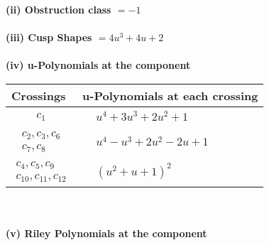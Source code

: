 \documentclass[1p]{elsarticle_modified}
\theoremstyle{definition}
\begin{document}
\flushleft \textbf{(ii) Obstruction class $= -1$}\\~\\
\flushleft \textbf{(iii) Cusp Shapes $= 4 u^3+4 u+2$}\\~\\
\newpage\renewcommand{\arraystretch}{1}
\flushleft \textbf{(iv) u-Polynomials at the component}\newline \\
\begin{tabular}{m{50pt}|m{274pt}}
Crossings & \hspace{64pt}u-Polynomials at each crossing \\
\hline $$\begin{aligned}c_{1}\end{aligned}$$&$\begin{aligned}
&u^4+3 u^3+2 u^2+1
\end{aligned}$\\
\hline $$\begin{aligned}c_{2},c_{3},c_{6}\\c_{7},c_{8}\end{aligned}$$&$\begin{aligned}
&u^4- u^3+2 u^2-2 u+1
\end{aligned}$\\
\hline $$\begin{aligned}c_{4},c_{5},c_{9}\\c_{10},c_{11},c_{12}\end{aligned}$$&$\begin{aligned}
&(u^2+u+1)^2
\end{aligned}$\\
\hline
\end{tabular}\\~\\
\newpage\renewcommand{\arraystretch}{1}
\flushleft \textbf{(v) Riley Polynomials at the component}\newline \\
\end{document}
